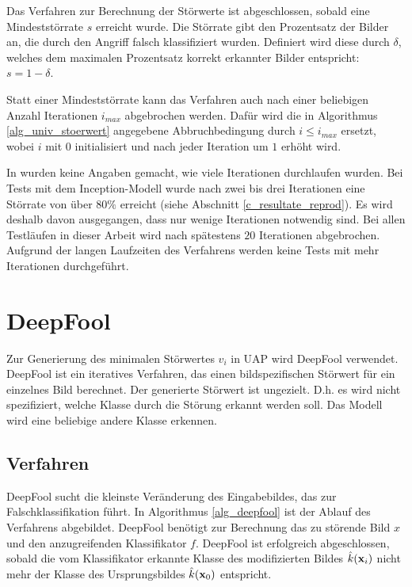 \documentclass{FFHS_Thesis_Additions/ffhsthesis}
\begin{document}
Das Verfahren zur Berechnung der Störwerte ist abgeschlossen, sobald eine Mindeststörrate $s$ erreicht wurde. Die Störrate gibt den Prozentsatz der Bilder an, die durch den Angriff falsch klassifiziert wurden.
Definiert wird diese durch $\delta$, welches dem maximalen Prozentsatz korrekt erkannter Bilder entspricht: $s = 1 - \delta $.

Statt einer Mindeststörrate kann das Verfahren auch nach einer beliebigen Anzahl Iterationen $i_{max}$ abgebrochen werden. 
Dafür wird die in Algorithmus \ref{alg_univ_stoerwert} angegebene Abbruchbedingung durch $i \leq i_{max}$ ersetzt, wobei $i$ mit $0$ initialisiert und nach jeder Iteration um $1$ erhöht wird.

In \cite{moosavi-dezfooli_universal_2017-1} wurden keine Angaben gemacht, wie viele Iterationen durchlaufen wurden. 
Bei Tests mit dem Inception-Modell wurde nach zwei bis drei Iterationen eine Störrate von über $80\%$ erreicht (siehe Abschnitt \ref{c_resultate_reprod}). 
Es wird deshalb davon ausgegangen, dass nur wenige Iterationen notwendig sind. 
Bei allen Testläufen in dieser Arbeit wird nach spätestens $20$ Iterationen abgebrochen. 
Aufgrund der langen Laufzeiten des Verfahrens werden keine Tests mit mehr Iterationen durchgeführt.

\chapter{DeepFool}
\label{c_deepfool}

Zur Generierung des minimalen Störwertes $v_i$ in UAP wird DeepFool \cite{moosavi-dezfooli_deepfool_2016} verwendet. 
DeepFool ist ein iteratives Verfahren, das einen bildspezifischen Störwert für ein einzelnes Bild berechnet. Der generierte Störwert ist ungezielt. D.h. es wird nicht spezifiziert, welche Klasse durch die Störung erkannt werden soll. Das Modell wird eine beliebige andere Klasse erkennen.

\section{Verfahren}

DeepFool sucht die kleinste Veränderung des Eingabebildes, das zur Falschklassifikation führt. 
In Algorithmus \ref{alg_deepfool} ist der Ablauf des Verfahrens abgebildet. 
DeepFool benötigt zur Berechnung das zu störende Bild $x$ und den anzugreifenden Klassifikator $f$. 
DeepFool ist erfolgreich abgeschlossen, sobald die vom Klassifikator erkannte Klasse des modifizierten Bildes $\hat{k}(\bold{x}_i)$ nicht mehr der Klasse des Ursprungsbildes $\hat{k}(\bold{x}_0)$ entspricht.
\end{document}
